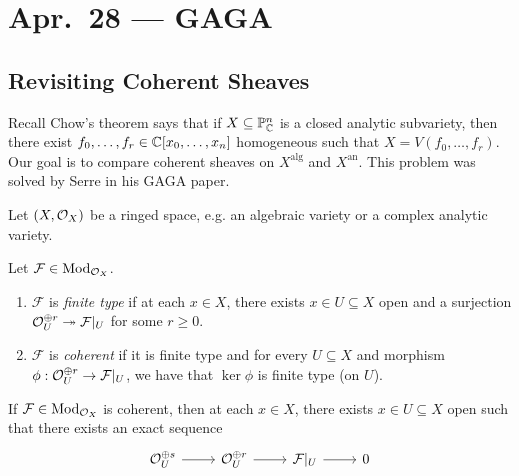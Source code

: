 \chapter{Apr.~28 --- GAGA}

\section{Revisiting Coherent Sheaves}

\begin{remark}
  Recall Chow's theorem says that if
  $X \subseteq \mathbb{P}^n_{\mathbb{C}}$ is a closed analytic
  subvariety, then there exist
  $f_0, \dots, f_r \in \mathbb{C}[x_0, \dots, x_n]$
  homogeneous such that
  $X = V(f_0, \dots, f_r)$.
  Our goal is to compare
  coherent sheaves on
  $X^{\mathrm{alg}}$ and $X^{\mathrm{an}}$.
  This problem was solved by Serre
  in his GAGA paper.
\end{remark}

\begin{remark}
  Let $(X, \mathcal{O}_X)$ be a ringed space,
  e.g. an algebraic variety or a complex analytic variety.
\end{remark}

\begin{definition}
  Let $\mathcal{F} \in \mathrm{Mod}_{\mathcal{O}_X}$.
  \begin{enumerate}
    \item $\mathcal{F}$ is \emph{finite type}
      if at each $x \in X$, there exists
      $x \in U \subseteq X$ open and
      a surjection
      $\mathcal{O}_U^{\oplus r} \twoheadrightarrow \mathcal{F}|_U$
      for some $r \ge 0$.
    \item $\mathcal{F}$ is
      \emph{coherent} if it is finite type
      and for every $U \subseteq X$ and
      morphism $\phi : \mathcal{O}_U^{\oplus r} \to \mathcal{F}|_U$,
      we have that $\ker \phi$ is
      finite type (on $U$).
  \end{enumerate}
\end{definition}

\begin{remark}
  If $\mathcal{F} \in \mathrm{Mod}_{\mathcal{O}_X}$ is coherent, then
  at each $x \in X$, there exists
  $x \in U \subseteq X$ open such that
  there exists an exact sequence
  \[
    \begin{tikzcd}
      \OO_U^{\oplus s}
      \ar[r] & \OO_U^{\oplus r}
      \ar[r] & \mathcal{F}|_U
      \ar[r] & 0
    \end{tikzcd}
  \]
\end{remark}

